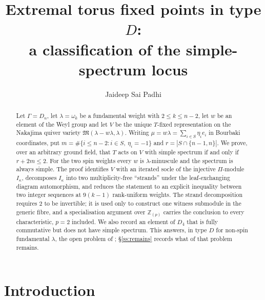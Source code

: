 \documentclass[reqno]{amsart}
\theoremstyle{plain}
\theoremstyle{definition}
\newcommand{\la}{\lambda}
\newcommand{\om}{\omega}
\newcommand{\ka}{\kappa}
\newcommand{\Pia}{\Pi}
\begin{document}
\title[Simple spectrum in type $D$]{Extremal torus fixed points in type $D$:\\
a classification of the simple-spectrum locus}

\author{Jaideep Sai Padhi}
\address{Department of Computer Science, Purdue University, West Lafayette, IN 47907}

\begin{abstract}
Let $\Gamma=D_n$, let $\la=\om_k$ be a fundamental weight with $2\le k\le n-2$,
let $w$ be an element of the Weyl group and let $V$ be the unique $T$-fixed
representation on the Nakajima quiver variety $\mathfrak{M}(\la-w\la,\la)$.
Writing $\mu=w\la=\sum_{i\in S}\eta_ie_i$ in Bourbaki coordinates, put
$m=\#\{i\le n-2: i\in S,\ \eta_i=-1\}$ and $r=|S\cap\{n-1,n\}|$.  We prove,
over an arbitrary ground field, that $T$ acts on $V$ with simple
spectrum if and only if $r+2m\le2$.  For the two spin weights every $w$ is
$\la$-minuscule and the spectrum is always simple.  The proof identifies $V$
with an iterated socle of the injective $\Pia$-module $I_\ka$, decomposes
$I_\ka$ into two multiplicity-free ``strands'' under the leaf-exchanging
diagram automorphism, and reduces the statement to an explicit inequality
between two integer sequences at $9(k-1)$ rank-uniform weights.  The strand
decomposition requires $2$ to be
invertible; it is used only to construct one witness submodule in the generic
fibre, and a specialisation argument over $\mathbb{Z}_{(p)}$ carries the
conclusion to every characteristic, $p=2$ included.  We also record
an element of $D_4$ that is fully commutative but does not have simple
spectrum.  This answers, in type $D$ for non-spin fundamental $\la$, the open
problem of \cite[\S5.4.2]{DKK}; \S\ref{ss:remains} records what of that problem
remains.
\end{abstract}

\maketitle

\section{Introduction}\label{sec:intro}
\end{document}
